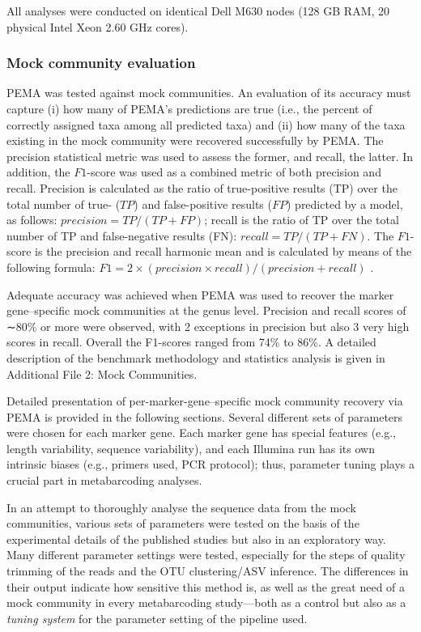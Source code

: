    All analyses were conducted on identical Dell M630 nodes (128 GB RAM, 20 physical Intel Xeon 2.60 GHz cores).


   \subsubsection*{Mock community evaluation}

   PEMA was tested against mock communities. 
   An evaluation of its accuracy must capture 
   (i) how many of PEMA's predictions are true (i.e., the percent of correctly assigned taxa among all predicted taxa) and 
   (ii) how many of the taxa existing in the mock community were recovered successfully by PEMA. 
   The precision statistical metric was used to assess the former, and recall, the latter. 
   In addition, the $F1$-score was used as a combined metric of both precision and recall. 
   Precision is calculated as the ratio of true-positive results (TP) over the total number of true- ($TP$) and false-positive results ($FP$) predicted by a model, as follows: $precision = TP/(TP + FP)$; 
   recall is the ratio of TP over the total number of TP and false-negative results (FN): $recall = TP/(TP + FN)$. 
   The $F1$-score is the precision and recall harmonic mean and is calculated by means of the following formula: 
   $F1 = 2 × (precision × recall)/(precision + recall)$ \citep{sammut2011encyclopedia}.

   Adequate accuracy was achieved when PEMA was used to recover the marker gene–specific mock communities at the genus level.
   Precision and recall scores of ∼80\% or more were observed, with 2 exceptions in precision but also 3 very high scores in recall. 
   Overall the F1-scores ranged from 74\% to 86\%. 
   A detailed description of the benchmark methodology and statistics analysis is given in Additional File 2: Mock Communities.

   Detailed presentation of per-marker-gene–specific mock community recovery via PEMA is provided in the following sections. 
   Several different sets of parameters were chosen for each marker gene. 
   Each marker gene has special features (e.g., length variability, sequence variability), and each Illumina run has its own intrinsic biases (e.g., primers used, PCR protocol); 
   thus, parameter tuning plays a crucial part in metabarcoding analyses.

   In an attempt to thoroughly analyse the sequence data from the mock communities, various sets of parameters were tested on the basis of the experimental details of the published studies but also in an exploratory way. 
   Many different parameter settings were tested, especially for the steps of quality trimming of the reads and the OTU clustering/ASV inference. 
   The differences in their output indicate how sensitive this method is, as well as the great need of a mock community in every metabarcoding study—both as a control but also as a \textit{tuning system} for the parameter setting of the pipeline used.

